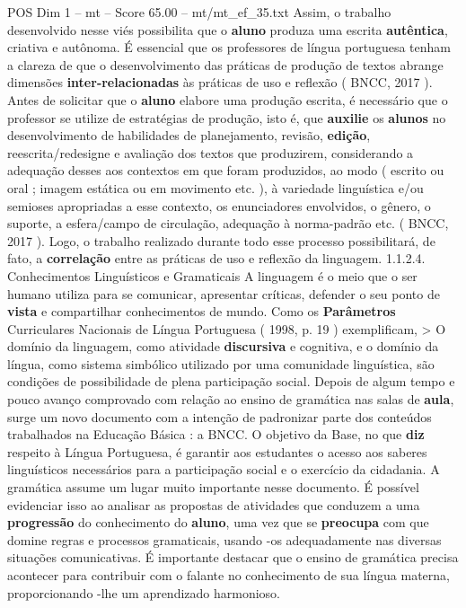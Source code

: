 \begin{textsample}{POS Dim 1 – mt – Score 65.00 – mt/mt\_ef\_35.txt}
Assim, o trabalho desenvolvido nesse viés possibilita que o \textbf{aluno} produza uma escrita \textbf{autêntica}, criativa e autônoma.
É essencial que os professores de língua portuguesa tenham a clareza de que o desenvolvimento das práticas de produção de textos abrange dimensões \textbf{inter-relacionadas} às práticas de uso e reflexão ( BNCC, 2017 ).
Antes de solicitar que o \textbf{aluno} elabore uma produção escrita, é necessário que o professor se utilize de estratégias de produção, isto é, que \textbf{auxilie} os \textbf{alunos} no desenvolvimento de habilidades de planejamento, revisão, \textbf{edição}, reescrita/redesigne e avaliação dos textos que produzirem, considerando a adequação desses aos contextos em que foram produzidos, ao modo ( escrito ou oral ; imagem estática ou em movimento etc. ), à variedade linguística e/ou semioses apropriadas a esse contexto, os enunciadores envolvidos, o gênero, o suporte, a esfera/campo de circulação, adequação à norma-padrão etc. ( BNCC, 2017 ).
Logo, o trabalho realizado durante todo esse processo possibilitará, de fato, a \textbf{correlação} entre as práticas de uso e reflexão da linguagem. 1.1.2.4.
Conhecimentos Linguísticos e Gramaticais A linguagem é o meio que o ser humano utiliza para se comunicar, apresentar críticas, defender o seu ponto de \textbf{vista} e compartilhar conhecimentos de mundo.
Como os \textbf{Parâmetros} Curriculares Nacionais de Língua Portuguesa ( 1998, p. 19 ) exemplificam, > O domínio da linguagem, como atividade \textbf{discursiva} e cognitiva, e o domínio da língua, como sistema simbólico utilizado por uma comunidade linguística, são condições de possibilidade de plena participação social.
Depois de algum tempo e pouco avanço comprovado com relação ao ensino de gramática nas salas de \textbf{aula}, surge um novo documento com a intenção de padronizar parte dos conteúdos trabalhados na Educação Básica : a BNCC.
O objetivo da Base, no que \textbf{diz} respeito à Língua Portuguesa, é garantir aos estudantes o acesso aos saberes linguísticos necessários para a participação social e o exercício da cidadania.
A gramática assume um lugar muito importante nesse documento.
É possível evidenciar isso ao analisar as propostas de atividades que conduzem a uma \textbf{progressão} do conhecimento do \textbf{aluno}, uma vez que se \textbf{preocupa} com que domine regras e processos gramaticais, usando -os adequadamente nas diversas situações comunicativas.
É importante destacar que o ensino de gramática precisa acontecer para contribuir com o falante no conhecimento de sua língua materna, proporcionando -lhe um aprendizado harmonioso.

\end{textsample}
